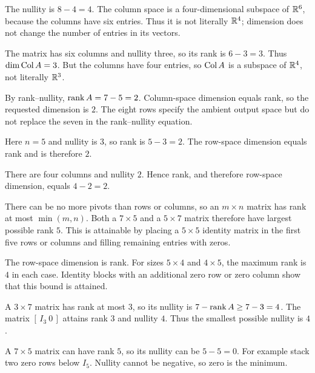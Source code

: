 The nullity is $8-4=4$. The column space is a four-dimensional subspace of
$\mathbb{R}^6$, because the columns have six entries. Thus it is not literally
$\mathbb{R}^4$; dimension does not change the number of entries in its vectors.

The matrix has six columns and nullity three, so its rank is $6-3=3$.
Thus $\dim\operatorname{Col} A=3$. But the columns have four entries, so $\operatorname{Col} A$ is a
subspace of $\mathbb{R}^4$, not literally $\mathbb{R}^3$.

By rank--nullity, $\operatorname{rank} A=7-5=2$. Column-space dimension equals rank,
so the requested dimension is $2$. The eight rows specify the ambient
output space but do not replace the seven in the rank--nullity equation.

Here $n=5$ and nullity is $3$, so rank is $5-3=2$.
The row-space dimension equals rank and is therefore $2$.

There are four columns and nullity $2$. Hence rank, and therefore row-space
dimension, equals $4-2=2$.

There can be no more pivots than rows or columns, so an $m\times n$ matrix
has rank at most $\min(m,n)$. Both a $7\times5$ and a $5\times7$ matrix
therefore have largest possible rank $5$. This is attainable by placing a
$5\times5$ identity matrix in the first five rows or columns and filling
remaining entries with zeros.

The row-space dimension is rank. For sizes $5\times4$ and $4\times5$,
the maximum rank is $4$ in each case. Identity blocks with an additional
zero row or zero column show that this bound is attained.

A $3\times7$ matrix has rank at most $3$, so its nullity is
$7-\operatorname{rank} A\ge7-3=4$. The matrix $[\,I_3\ 0\,]$ attains rank $3$ and
nullity $4$. Thus the smallest possible nullity is $4$.

A $7\times5$ matrix can have rank $5$, so its nullity can be $5-5=0$.
For example stack two zero rows below $I_5$. Nullity cannot be negative,
so zero is the minimum.

